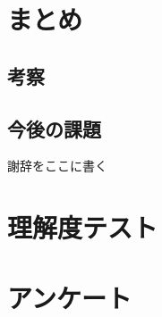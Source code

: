 \documentclass[uplatex,a4paper,12pt]{ujreport}
\begin{document}
\chapter{まとめ}
\section{考察}
\section{今後の課題}

\acknowledgment
謝辞をここに書く




\appendix
\chapter{理解度テスト}
\chapter{アンケート}
\end{document}
